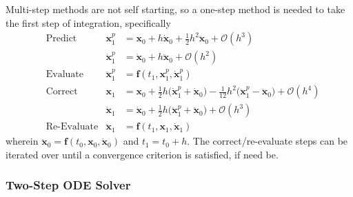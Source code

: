 Multi-step methods are not self starting, so a one-step method is needed to take the first step of integration, specifically
\begin{subequations}
    \label{pairedStartUp}
    \begin{align}
    \mbox{} & \text{Predict} & 
    \mathbf{x}_1^p & = \mathbf{x}_0 + h \dot{\mathbf{x}}_0 +
    \tfrac{1}{2} h^2 \ddot{\mathbf{x}}_0 + \mathcal{O} (h^3) 
    \label{startupDisplacementPredictor} \\
    \mbox{} & &
    \dot{\mathbf{x}}^p_1 & = \dot{\mathbf{x}}_0 + h \ddot{\mathbf{x}}_0 + 
    \mathcal{O} (h^2) 
    \label{startUpVelocityPredictor} \\
    \mbox{} & \text{Evaluate} &
    \ddot{\mathbf{x}}^p_1 & = \mathbf{f} (t_1, \mathbf{x}^p_1, \dot{\mathbf{x}}^p_1)
    \label{startUpEvaluate} \\
    \mbox{} & \text{Correct} &
    \mathbf{x}_1 & = \mathbf{x}_0 + \tfrac{1}{2} h 
    \bigl( \dot{\mathbf{x}}^p_1 + \dot{\mathbf{x}}_0 \bigr) -
    \tfrac{1}{12} h^2 \bigl( \ddot{\mathbf{x}}^p_1 - 
    \ddot{\mathbf{x}}_0 \bigr) + \mathcal{O} (h^4) 
    \label{startupDisplacementCorrector} \\
    \mbox{} & &
    \dot{\mathbf{x}}_1 & = \dot{\mathbf{x}}_0 + \tfrac{1}{2} h 
    \bigl( \ddot{\mathbf{x}}_1^p + \ddot{\mathbf{x}}_0 \bigr) + 
    \mathcal{O} (h^3)
    \label{startUpVelocityCorrector} \\
    \mbox{} & \text{Re-Evaluate} &
    \ddot{\mathbf{x}}_1 & = \mathbf{f} (t_1, \mathbf{x}_1, \dot{\mathbf{x}}_1) 
    \label{startUpReEvaluate}
    \end{align}
\end{subequations}
wherein $\ddot{\mathbf{x}}_0 = \mathbf{f}(t_0, \mathbf{x}_0, \dot{\mathbf{x}}_0)$ and $t_1 = t_0 + h$.  The correct\slash re-evaluate steps can be iterated over until a convergence criterion is satisfied, if need be.

\subsubsection{Two-Step ODE Solver}


